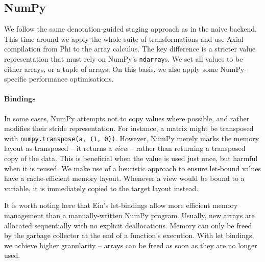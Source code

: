\subsection{NumPy}

We follow the same denotation-guided staging approach as in the naive backend. This time around we apply the whole suite of transformations and use Axial compilation from Phi to the array calculus. The key difference is a stricter value representation that must rely on NumPy's \texttt{ndarray}s. We set all values to be either arrays, or a tuple of arrays. On this basis, we also apply some NumPy-specific performance optimisations.

\paragraph{Bindings} In some cases, NumPy attempts not to copy values where possible, and rather modifies their stride representation. For instance, a matrix might be transposed with \texttt{numpy.transpose(a, (1, 0))}. However, NumPy merely marks the memory layout as transposed -- it returns a \textit{view} -- rather than returning a transposed copy of the data. This is beneficial when the value is used just once, but harmful when it is reused. We make use of a heuristic approach to ensure let-bound values have a cache-efficient memory layout. Whenever a view would be bound to a variable, it is immediately copied to the target layout instead. 

It is worth noting here that Ein's let-bindings allow more efficient memory management than a manually-written NumPy program. Usually, new arrays are allocated sequentially with no explicit deallocations. Memory can only be freed by the garbage collector at the end of a function's execution. With let bindings, we achieve higher granularity -- arrays can be freed as soon as they are no longer used.

